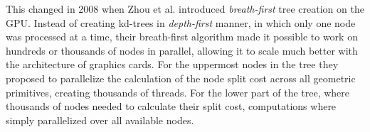 
This changed in 2008 when Zhou et al. introduced
\textit{breath-first} tree creation on the GPU. Instead of creating
kd-trees in \textit{depth-first} manner, in which only one node was processed
at a time, their breath-first algorithm made it possible to work on
hundreds or thousands of nodes in parallel, allowing it to scale much
better with the architecture of graphics cards. For the uppermost
nodes in the tree they proposed to parallelize the calculation of the
node split cost across all geometric primitives, creating thousands of
threads. For the lower part of the tree, where thousands of nodes
needed to calculate their split cost, computations where simply
parallelized over all available nodes.




